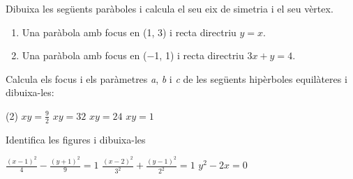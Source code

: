 \begin{activitats}
\begin{mylist}

	
\item  Dibuixa les següents paràboles i calcula el seu eix de simetria i el seu vèrtex. 
	\begin{enumerate}
		\item  Una paràbola amb focus en (1, 3) i recta directriu $y = x$.
		
		\item  Una paràbola amb focus en ($-$1, 1) i recta directriu $3x+y = 4$.
	\end{enumerate}

\answers{[
	$d(X,d)=d(X,F)$\par $(x-1)^2+(y-3)^2=\left( \dfrac{|x-y|}{\sqrt{2}} \right)^2$\par
	$x^2+y^2+2xy-4x-12y+20=0$\par
	L'eix simetria passa per focus i és perpendicular directriu $y=-x+4$,
	$d(X,d)=d(X,F)$\par $(x+1)^2+(y-1)^2=\left( \dfrac{|3x+y-4|}{\sqrt{10}} \right)^2$\par
	$x^2+9y^2-6xy+44x-12y+4=0$\par 
	L'eix simetria passa per focus i és perpendicular directriu $y=\frac{1}{3}x+\frac{4}{3}$
	\par
	\ggblink{https://www.geogebra.org/m/CxZaNSBY}
	]}

	
\item  Calcula els focus i els paràmetres \textit{a}, \textit{b} i \textit{c} de les següents hipèrboles equilàteres i dibuixa-les:
	\begin{tasks}(2)
		\task $xy=\frac{9}{2}$  \task $xy=32$   \task $xy=24$   \task $xy=1$
	\end{tasks}



\item  Identifica les figures i dibuixa-les
\begin{tasks} 
	\task   $\frac{\left(x-1\right)^{2} }{4} -\frac{\left(y+1\right)^{2} }{9} =1$   \task   $\frac{\left(x-2\right)^{2} }{3^{2} } +\frac{\left(y-1\right)^{2} }{2^{2} } =1$ \task  $y^{2} -2x=0$   
\end{tasks}


\end{mylist}
\end{activitats}
